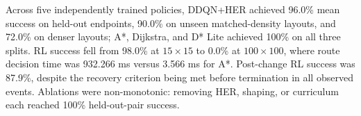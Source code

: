 Across five independently trained policies, DDQN+HER achieved 96.0\% mean success on held-out endpoints, 90.0\% on unseen matched-density layouts, and 72.0\% on denser layouts; A*, Dijkstra, and D* Lite achieved 100\% on all three splits. RL success fell from 98.0\% at $15\times15$ to 0.0\% at $100\times100$, where route decision time was 932.266 ms versus 3.566 ms for A*. Post-change RL success was 87.9\%, despite the recovery criterion being met before termination in all observed events. Ablations were non-monotonic: removing HER, shaping, or curriculum each reached 100\% held-out-pair success.
